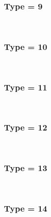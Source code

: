 \documentclass{article}
\begin{document}
        
        
            \subsubsection*{Type = 9}    
            
            \\
        
        
        
            \subsubsection*{Type = 10}    
            
            \\
        
        
        
            \subsubsection*{Type = 11}    
            
            \\
        
        
        
            \subsubsection*{Type = 12}   
            
            
            \\
        
        
        
            \subsubsection*{Type = 13}    
            
            
            \\
        
        
        
            \subsubsection*{Type = 14}    
            
            
            \\
        
        
        
\end{document}
